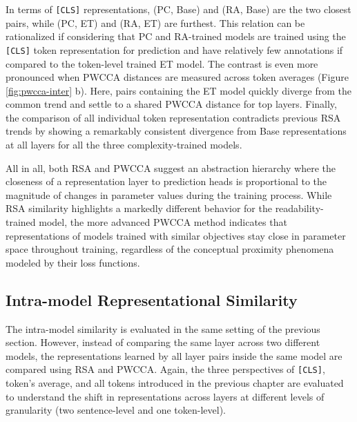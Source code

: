 \documentclass[a4paper, nobind]{templates/ociamthesis}
\begin{document}
In terms of \texttt{{[}CLS{]}} representations, (PC, Base) and (RA, Base) are the two closest pairs, while (PC, ET) and (RA, ET) are furthest. This relation can be rationalized if considering that PC and RA-trained models are trained using the \texttt{{[}CLS{]}} token representation for prediction and have relatively few annotations if compared to the token-level trained ET model. The contrast is even more pronounced when PWCCA distances are measured across token averages (Figure \ref{fig:pwcca-inter} b). Here, pairs containing the ET model quickly diverge from the common trend and settle to a shared PWCCA distance for top layers. Finally, the comparison of all individual token representation contradicts previous RSA trends by showing a remarkably consistent divergence from Base representations at all layers for all the three complexity-trained models.

All in all, both RSA and PWCCA suggest an abstraction hierarchy where the closeness of a representation layer to prediction heads is proportional to the magnitude of changes in parameter values during the training process. While RSA similarity highlights a markedly different behavior for the readability-trained model, the more advanced PWCCA method indicates that representations of models trained with similar objectives stay close in parameter space throughout training, regardless of the conceptual proximity phenomena modeled by their loss functions.

\hypertarget{subsubchap:ex2-intra}{%
\subsection{Intra-model Representational Similarity}\label{subsubchap:ex2-intra}}

The intra-model similarity is evaluated in the same setting of the previous section. However, instead of comparing the same layer across two different models, the representations learned by all layer pairs inside the same model are compared using RSA and PWCCA. Again, the three perspectives of \texttt{{[}CLS{]}}, token's average, and all tokens introduced in the previous chapter are evaluated to understand the shift in representations across layers at different levels of granularity (two sentence-level and one token-level).
\end{document}

